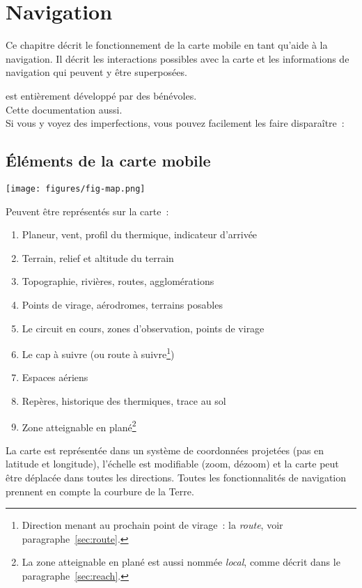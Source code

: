 
\chapter{Navigation}\label{cha:navigation}
Ce chapitre décrit le fonctionnement de la carte mobile en tant qu'aide à la navigation.
Il décrit les interactions possibles avec la carte et les informations de navigation qui peuvent y être superposées.

\begin{framed}
	\begin{center}
		\xc{} est entièrement développé par des bénévoles.\\
		Cette documentation aussi.\\
		Si vous y voyez des imperfections, vous pouvez facilement les faire disparaître~:\\
	\end{center}
\end{framed}

\section{Éléments de la carte mobile}

\begin{maxipage}
\texttt{[image: figures/fig-map.png]}
\end{maxipage}

Peuvent être représentés sur la carte~:
\begin{enumerate} 
\item Planeur, vent, profil du thermique, indicateur d'arrivée
\item Terrain, relief et altitude du terrain
\item Topographie, rivières, routes, agglomérations
\item Points de virage, aérodromes, terrains posables
\item Le circuit en cours, zones d'observation, points de virage
\item Le cap à suivre (ou route à suivre\footnote{Direction menant au prochain point de virage~: la \emph{route}, voir paragraphe~\ref{sec:route}.}) 
\item Espaces aériens
\item Repères, historique des thermiques, trace au sol
\item Zone atteignable en plané\footnote{La zone atteignable en plané est aussi nommée \emph{local}, comme décrit dans le paragraphe~\ref{sec:reach}.}
\end{enumerate}
La carte est représentée dans un système de coordonnées projetées (pas en latitude et longitude), l'échelle est modifiable (zoom, dézoom) et la carte peut être déplacée dans toutes les directions. Toutes les fonctionnalités de navigation prennent en compte la courbure de la Terre.

